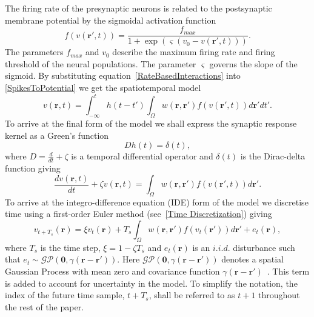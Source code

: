 \documentclass[10pt,a4paper]{article}
\begin{document}
The firing rate of the presynaptic neurons is related to the postsynaptic membrane potential by the sigmoidal activation function 
\begin{equation}
	\label{ActivationFunction} f\left( v\left( \mathbf{r}', t \right) \right) = \frac{f_{max}}{1 + \exp \left( \varsigma \left( v_0 - v\left(\mathbf{r}',t\right) \right) \right)}. 
\end{equation}
The parameters $f_{max}$ and $v_0$ describe the maximum firing rate and firing threshold of the neural populations. The parameter $\varsigma$ governs the slope of the sigmoid. By substituting equation~\ref{RateBasedInteractions} into \ref{SpikesToPotential} we get the spatiotemporal model 
\begin{equation}
	\label{FullDoubleIntModel} v\left(\mathbf{r},t\right) =
	\int_{-\infty}^t 
	h\left(t - t'\right) \int_\Omega
	w\left(\mathbf{r},\mathbf{r}'\right) 
	f\left( v\left( \mathbf{r}',t \right)\right)
	d\mathbf{r}'dt'.
\end{equation}
To arrive at the final form of the model we shall express the synaptic response kernel as a Green's function 
\begin{equation}
	\label{GreensFuncDef} Dh\left( t \right) = \delta \left( t \right), 
\end{equation}
where $D=\frac{d}{dt} + \zeta$ is a temporal differential operator and $\delta(t)$ is the Dirac-delta function giving 
\begin{equation}
	\label{FinalFormContinuous} 
	\frac{dv\left( \mathbf{r},t \right)}{dt} + \zeta v\left( \mathbf{r},t \right) = \int_\Omega {w\left( \mathbf{r},\mathbf{r}' \right)f\left( {v\left( \mathbf{r}',t \right)} \right)d\mathbf{r}'}. 
\end{equation}
To arrive at the integro-difference equation (IDE) form of the model we discretise time using a first-order Euler method (see~\ref{Time Discretization}) giving 
\begin{equation}
	\label{DiscreteTimeModel} 
	v_{t+T_s}\left(\mathbf{r}\right) = 
	\xi v_t\left(\mathbf{r}\right) + 
	T_s \int_\Omega { 
	    w\left(\mathbf{r},\mathbf{r}'\right)
	    f\left(v_t\left(\mathbf{r}'\right)\right) 
	d\mathbf{r}'} 
	+ e_t\left(\mathbf{r}\right), 
\end{equation}
where $T_s$ is the time step, $\xi = 1-\zeta T_s$ and $e_t(\mathbf{r})$ is an $i.i.d.$ disturbance such that $e_t\sim\mathcal{GP}(\mathbf 0,\gamma(\mathbf{r}-\mathbf{r}'))$. Here $\mathcal{GP}(\mathbf 0,\gamma(\mathbf{r}-\mathbf{r}'))$ denotes a spatial Gaussian Process with mean zero and covariance function $\gamma(\mathbf{r}-\mathbf{r}')$~\cite{Rasmussen2005}. This term is added to account for uncertainty in the model. To simplify the notation, the index of the future time sample, $t+T_s$, shall be referred to as $t+1$ throughout the rest of the paper. 
\end{document}
